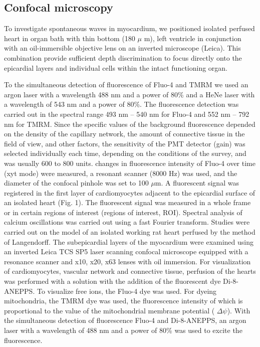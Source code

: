 \documentclass{biophys-new}
\begin{document}
\subsection*{Confocal microscopy}
To investigate spontaneous  waves in myocardium, we positioned isolated perfused heart in organ bath with thin bottom (180 $\mu$ m), left ventricle in conjunction with an oil-immersible objective lens on an inverted microscope (Leica).
This combination provide sufficient depth discrimination to focus directly onto the epicardial layers and individual cells within the intact functioning organ.

To the simultaneous detection of fluorescence of Fluo-4 and TMRM we used an argon laser with a wavelength 488 nm and a power of 80\% and a HeNe laser with a wavelength of 543 nm and a power of 80\%. The fluorescence detection was carried out in the spectral range 493 nm -- 540 nm for Fluo-4 and 552 nm -- 792 nm for TMRM. Since the specific values of the background fluorescence depended on the density of the capillary network, the amount of connective tissue in the field of view, and other factors, the sensitivity of the PMT detector (gain) was selected individually each time, depending on the conditions of the survey, and was usually 600 to 800 units.
changes in fluorescence intensity of Fluo-4 over time (xyt mode) were measured, a resonant scanner (8000 Hz) was used, and the diameter of the confocal pinhole was set to 100 $\mu$m.
A fluorescent signal was registered in the first layer of cardiomyocytes adjacent to the epicardial surface of an isolated heart (Fig. 1). The fluorescent signal was measured in a whole frame or in certain regions of interest (regions of interest, ROI).
Spectral analysis of calcium oscillations was carried out using a fast Fourier transform.
Studies were carried out on the model of an isolated working rat heart perfused by the method of Langendorff.
The subepicardial layers of the myocardium were examined using an inverted Leica TCS SP5 laser scanning confocal microscope equipped with a resonance scanner and x10, x20, x63 lenses with oil immersion.
For visualization of cardiomyocytes, vascular network and connective tissue, perfusion of the hearts was performed with a solution with the addition of the fluorescent dye Di-8-ANEPPS.
To visualize free  ions, the Fluo-4 dye was used.
For dyeing mitochondria, the TMRM dye was used, the fluorescence intensity of which is proportional to the value of the mitochondrial membrane potential ( $\Delta\psi$).
With the simultaneous detection of fluorescence Fluo-4 and Di-8-ANEPPS, an argon laser with a wavelength of 488 nm and a power of 80\% was used to excite the fluorescence.
\end{document}

